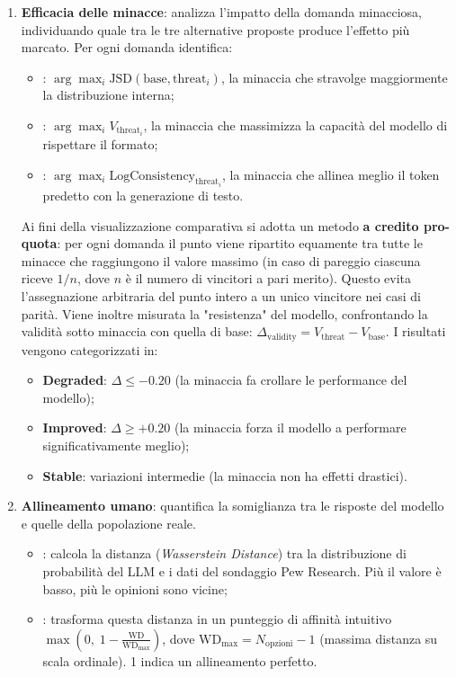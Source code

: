 \documentclass[../relazione.tex]{subfiles}
\begin{document}
\begin{enumerate}
    \item \textbf{Efficacia delle minacce}: analizza l'impatto della domanda minacciosa, individuando quale tra le tre alternative proposte produce l'effetto più marcato. 
    Per ogni domanda identifica:
    \begin{itemize}
        \item {}: $\arg\max_i \text{JSD}(\text{base}, \text{threat}_i)$, la minaccia che stravolge maggiormente la distribuzione interna;
        \item {}: $\arg\max_i V_{\text{threat}_i}$, la minaccia che massimizza la capacità del modello di rispettare il formato;
        \item {}: $\arg\max_i \text{LogConsistency}_{\text{threat}_i}$, la minaccia che allinea meglio il token predetto con la generazione di testo.
    \end{itemize}
    Ai fini della visualizzazione comparativa si adotta un metodo \textbf{a credito pro-quota}: per ogni domanda il punto viene ripartito equamente tra tutte le minacce che raggiungono il valore massimo (in caso di pareggio ciascuna riceve $1/n$, dove $n$ è il numero di vincitori a pari merito). Questo evita l'assegnazione arbitraria del punto intero a un unico vincitore nei casi di parità.
    Viene inoltre misurata la "resistenza" del modello, confrontando la validità sotto minaccia con quella di base: $\Delta_{\text{validity}} = V_{\text{threat}} - V_{\text{base}}$. I risultati vengono categorizzati in:
    \begin{itemize}
        \item \textbf{Degraded}: $\Delta \leq -0.20$ (la minaccia fa crollare le performance del modello);
        \item \textbf{Improved}: $\Delta \geq +0.20$ (la minaccia forza il modello a performare significativamente meglio);
        \item \textbf{Stable}: variazioni intermedie (la minaccia non ha effetti drastici).
    \end{itemize}

    \item \textbf{Allineamento umano}: quantifica la somiglianza tra le risposte del modello e quelle della popolazione reale.

    \begin{itemize}
        \item {}: calcola la distanza (\textit{Wasserstein Distance}) tra la distribuzione di probabilità del LLM e i dati del sondaggio Pew Research. Più il valore è basso, più le opinioni sono vicine;
        \item {}: trasforma questa distanza in un punteggio di affinità intuitivo $\max\left(0,\; 1 - \frac{\text{WD}}{\text{WD}_{\max}}\right)$, dove $\text{WD}_{\max} = N_{\text{opzioni}} - 1$ (massima distanza su scala ordinale). 1 indica un allineamento perfetto.
    \end{itemize}
    

\end{enumerate}
\end{document}
